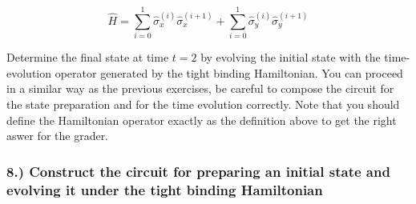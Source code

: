 \documentclass[11pt]{article}
\begin{document}
\[\hat{H} = \sum_{i=0}^{1} \hat{\sigma}_x^{(i)} \hat{\sigma}_x^{(i+1)}  + \sum_{i=0}^{1} \hat{\sigma}_y^{(i)} \hat{\sigma}_y^{(i+1)} \]

Determine the final state at time \(t=2\) by evolving the initial state
with the time-evolution operator generated by the tight binding
Hamiltonian. You can proceed in a similar way as the previous exercises,
be careful to compose the circuit for the state preparation and for the
time evolution correctly. Note that you should define the Hamiltonian
operator exactly as the definition above to get the right aswer for the
grader.

\hypertarget{construct-the-circuit-for-preparing-an-initial-state-and-evolving-it-under-the-tight-binding-hamiltonian}{%
\subsubsection{8.) Construct the circuit for preparing an initial state
and evolving it under the tight binding
Hamiltonian}\label{construct-the-circuit-for-preparing-an-initial-state-and-evolving-it-under-the-tight-binding-hamiltonian}}
\end{document}
